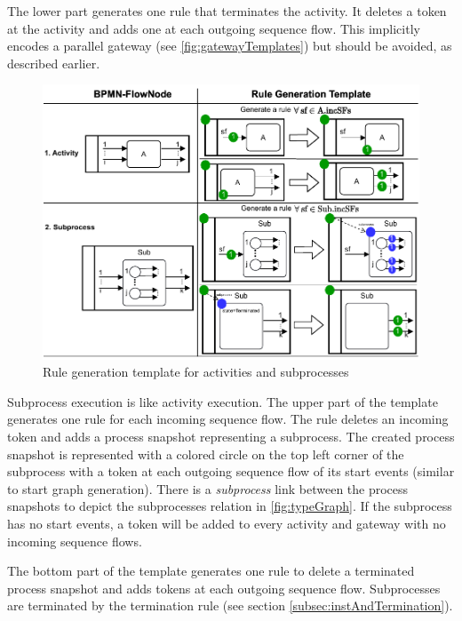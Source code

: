 \documentclass{lmcs} %
\theoremstyle{plain}\newtheorem{satz}[thm]{Satz} %
\begin{document}
The lower part generates one rule that terminates the activity.
It deletes a token at the activity and adds one at each outgoing sequence flow.
This implicitly encodes a parallel gateway (see \autoref{fig:gatewayTemplates}) but should be avoided, as described earlier. 

\begin{figure}[ht]
    \centering
    \includegraphics[width=1\textwidth]{images/activities_template.pdf}
    \caption{Rule generation template for activities and subprocesses}
    \label{fig:activityTemplates}
\end{figure}

Subprocess execution is like activity execution.
The upper part of the template generates one rule for each incoming sequence flow.
The rule deletes an incoming token and adds a process snapshot representing a subprocess. 
The created process snapshot is represented with a colored circle on the top left corner of the subprocess with a token at each outgoing sequence flow of its start events (similar to start graph generation).
There is a \textit{subprocess} link between the process snapshots to depict the \textsf{subprocesses} relation in \autoref{fig:typeGraph}.
If the subprocess has no start events, a token will be added to every activity and gateway with no incoming sequence flows.

The bottom part of the template generates one rule to delete a terminated process snapshot and adds tokens at each outgoing sequence flow.
Subprocesses are terminated by the termination rule (see section \ref{subsec:instAndTermination}).
\end{document}
